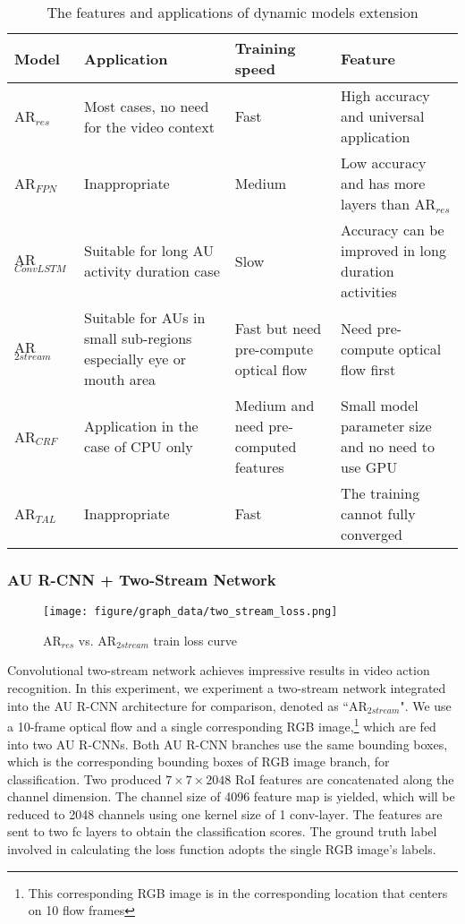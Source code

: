 \documentclass[5p,twocolumn]{elsarticle}
\begin{document}
\begin{table*}[t!]
	\scriptsize	
	\caption{The features and applications of dynamic models extension}
	\label{tab:dynamic_summary}
	\centering
	\tabcolsep=0.15cm
	
	\begin{tabular}{llll}
		\toprule
		Model & Application & Training speed & Feature  \\
		\midrule
		AR$_{res}$ & Most cases, no need for the video context & Fast & High accuracy and universal application \\
		AR$_{FPN}$ & Inappropriate &  Medium & Low accuracy and has more layers than AR$_{res}$  \\
		AR$_{ConvLSTM}$ & Suitable for long AU activity duration case & Slow & Accuracy can be improved in long duration activities\\
		AR$_{2stream}$ & Suitable for AUs in small sub-regions especially eye or mouth area & Fast but need pre-compute optical flow & Need pre-compute optical flow first \\
		AR$_{CRF}$ & Application in the case of CPU only & Medium and need pre-computed features & Small model parameter size and no need to use GPU \\
		AR$_{TAL}$ & Inappropriate & Fast & The training cannot fully converged \\
		\bottomrule
	\end{tabular}
\end{table*}

\subsubsection{AU R-CNN + Two-Stream Network}
\begin{figure}[htbp]
	\setlength{\abovecaptionskip}{0pt}
	\setlength{\belowcaptionskip}{-0pt}
	\begin{center}
		\texttt{[image: figure/graph\_data/two\_stream\_loss.png]}
	\end{center}
	\caption{AR$_{res}$ vs. AR$_{2stream}$ train loss curve}
	\label{fig:two_stream_loss}
	\vspace{-0.0cm}
\end{figure}

Convolutional two-stream network \cite{feichtenhofer2016convolutional} achieves impressive results in video action recognition. In this experiment, we experiment a two-stream network integrated into the AU R-CNN architecture for comparison, denoted as ``AR$_{2stream}$".
We use a 10-frame optical flow and a single corresponding RGB image,\footnote{This corresponding RGB image is in the corresponding location that centers on 10 flow frames} which are fed into two AU R-CNNs. Both AU R-CNN branches use the same bounding boxes, which is the corresponding bounding boxes of RGB image branch, for classification. Two produced $7\times 7\times 2048$ RoI features are concatenated along the channel dimension. The channel size of 4096 feature map is yielded, which will be reduced to 2048 channels using one kernel size of 1 conv-layer. The features are sent to two fc layers to obtain the classification scores. The ground truth label involved in calculating the loss function adopts the single RGB image's labels. 
\end{document}
